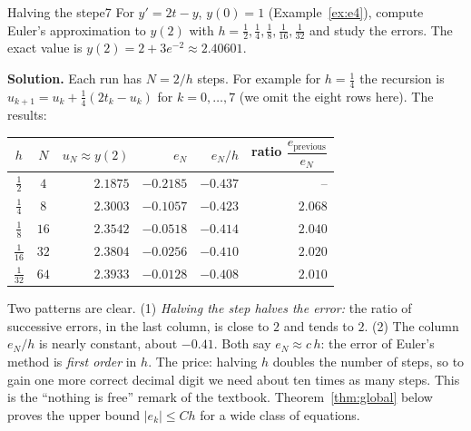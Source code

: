 \documentclass[11pt]{article}
\begin{document}
\begin{exmp}{Halving the step}{e7}
For $y'=2t-y$, $y(0)=1$ (Example~\ref{ex:e4}), compute Euler's approximation to $y(2)$ with $h=\frac12,\frac14,\frac18,\frac1{16},\frac1{32}$ and study the errors. The exact value is $y(2)=2+3e^{-2}\approx2.40601$.

\textbf{Solution.} Each run has $N=2/h$ steps. For example for $h=\frac14$ the recursion is $u_{k+1}=u_k+\frac14(2t_k-u_k)$ for $k=0,\dots,7$ (we omit the eight rows here). The results:
\begin{center}
\begin{tabular}{ccrrrr}
\toprule $h$ & $N$ & $u_N\approx y(2)$ & $e_N$ & $e_N/h$ & ratio $\dfrac{e_{\text{previous}}}{e_N}$ \\\midrule
$\frac12$ & $4$ & $2.1875$ & $-0.2185$ & $-0.437$ & --\\
$\frac1{4}$ & $8$ & $2.3003$ & $-0.1057$ & $-0.423$ & $2.068$\\
$\frac1{8}$ & $16$ & $2.3542$ & $-0.0518$ & $-0.414$ & $2.040$\\
$\frac1{16}$ & $32$ & $2.3804$ & $-0.0256$ & $-0.410$ & $2.020$\\
$\frac1{32}$ & $64$ & $2.3933$ & $-0.0128$ & $-0.408$ & $2.010$\\
\bottomrule
\end{tabular}
\end{center}
Two patterns are clear. (1) \emph{Halving the step halves the error:} the ratio of successive errors, in the last column, is close to $2$ and tends to $2$. (2) The column $e_N/h$ is nearly constant, about $-0.41$. Both say $e_N\approx c\,h$: the error of Euler's method is \emph{first order} in $h$. The price: halving $h$ doubles the number of steps, so to gain one more correct decimal digit we need about ten times as many steps. This is the ``nothing is free'' remark of the textbook. Theorem~\ref{thm:global} below proves the upper bound $\lvert e_k\rvert\le Ch$ for a wide class of equations.
\end{exmp}
\end{document}
